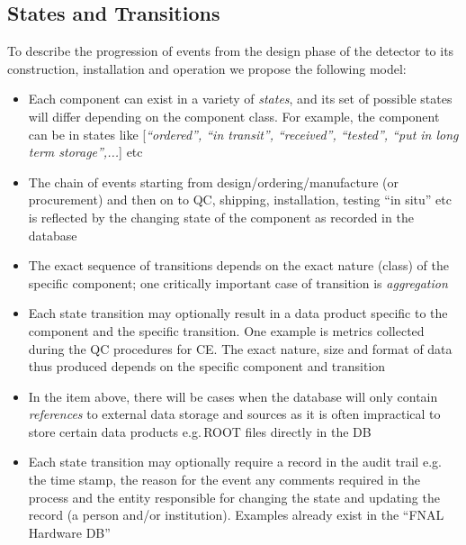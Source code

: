 \documentclass[pdftex,12pt,letter]{article}
\begin{document}

\subsection{States and Transitions}

\label{states}
To describe the progression of events from the design phase of the detector to its construction, installation
and operation we propose the following model:

\begin{itemize}

\item Each component can exist in a variety of \textit{states}, and its set of possible states will differ depending on
the component class. For example, the component can be in states like
[\textit{``ordered'', ``in transit'', ``received'', ``tested'', ``put in long term storage'',...}] etc

\item The chain of events starting from design/ordering/manufacture (or procurement) and then on to QC,
shipping, installation, testing ``in situ'' etc is reflected by the changing state of the component as recorded
in the database

\item The exact sequence of transitions depends on the exact nature (class) of the specific  component; one
critically important case of transition is \textit{aggregation}

\item Each state transition may optionally result in a data product specific to the component and the specific transition.
One example is metrics collected during the QC procedures for CE. The exact nature, size and format of data thus produced
depends on the specific component and transition

\item In the item above, there will be cases when the database will only contain \textit{references} to external data storage
and sources as it is often impractical to store certain data products e.g.\,ROOT files directly in the DB

\item Each state transition may optionally require a record in the audit trail e.g.\,the time stamp, the reason for the event
any comments required in the process and the entity responsible for changing the state and updating the record
(a person and/or institution). Examples already exist in the ``FNAL Hardware DB''

\end{itemize}
\end{document}
